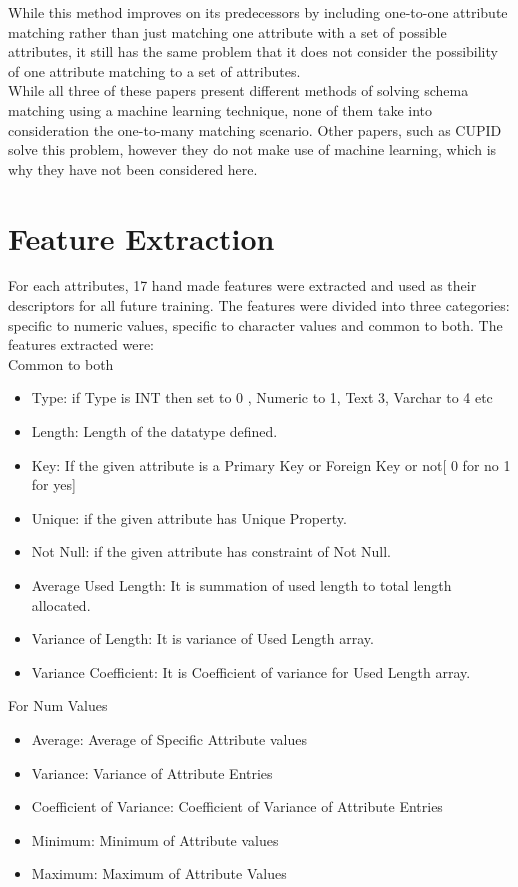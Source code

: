 \documentclass[conference]{IEEEtran}
\begin{document}
While this method improves on its predecessors by including one-to-one attribute matching rather
than just matching one attribute with a set of possible attributes, it still has the same problem that it
does not consider the possibility of one attribute matching to a set of attributes.\\

\noindent
While all three of these papers present different methods of solving schema matching using a machine learning technique, none of them take into consideration the one-to-many matching scenario. Other papers, such as CUPID\cite{ref4} solve this problem, however they do not make use of machine learning, which is why they have not been considered here.

\section{Feature Extraction}
For each attributes, 17 hand made features were extracted and used as their descriptors for all future training. The features were divided into three categories: specific to numeric values, specific to character values and common to both. The features extracted were:\\

\vspace{3cm}
Common to both
\begin{itemize}
\item Type: if Type is INT then set to 0 , Numeric to 1, Text 3, Varchar to 4 etc
\item Length: Length of the datatype defined.
\item Key: If the given attribute is a Primary Key or Foreign Key or not[ 0 for no 1 for yes]
\item Unique: if the given attribute has Unique Property.
\item Not Null: if the given attribute has constraint of Not Null.
\item Average Used Length: It is summation of used length to total length allocated.
\item Variance of Length: It is variance of Used Length array.
\item Variance Coefficient: It is Coefficient of variance for Used Length array.
\end{itemize}

For Num Values
\begin{itemize}
\item Average: Average of Specific Attribute values
\item Variance: Variance of Attribute Entries
\item Coefficient of Variance: Coefficient of Variance of Attribute Entries
\item Minimum: Minimum of Attribute values
\item Maximum: Maximum of Attribute Values
\end{itemize}
\end{document}
